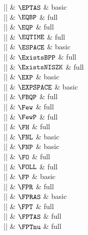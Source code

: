 |\EPTAS|    & $\EPTAS$ & basic \\

|\EQBP|    & $\EQBP$ & full \\

|\EQP|    & $\EQP$ & full \\

|\EQTIME|    & $\EQTIME$ & full \\

|\ESPACE|    & $\ESPACE$ & basic \\

|\ExistsBPP|    & $\ExistsBPP$ & full \\

|\ExistsNISZK|    & $\ExistsNISZK$ & full \\

|\EXP|    & $\EXP$ & basic \\

|\EXPSPACE|    & $\EXPSPACE$ & basic \\

|\FBQP|    & $\FBQP$ & full \\

|\Few|    & $\Few$ & full \\

|\FewP|    & $\FewP$ & full \\

|\FH|    & $\FH$ & full \\

|\FNL|    & $\FNL$ & basic \\

|\FNP|    & $\FNP$ & basic \\

|\FO|    & $\FO$ & full \\

|\FOLL|    & $\FOLL$ & full \\

|\FP|    & $\FP$ & basic \\

|\FPR|    & $\FPR$ & full \\

|\FPRAS|    & $\FPRAS$ & basic \\

|\FPT|    & $\FPT$ & full \\

|\FPTAS|    & $\FPTAS$ & full \\

|\FPTnu|    & $\FPTnu$ & full \\


